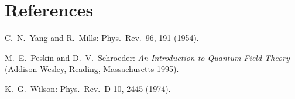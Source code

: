 \section*{References}

\begin{enumerate}[label={[\arabic*]}]
  \item C.~N.~Yang and R.~Mills: Phys.\ Rev.\ 96, 191 (1954).
  \item M.~E.~Peskin and D.~V.~Schroeder: \emph{An Introduction to Quantum
        Field Theory} (Addison-Wesley, Reading, Massachusetts 1995).
  \item K.~G.~Wilson: Phys.\ Rev.\ D 10, 2445 (1974).
\end{enumerate}
